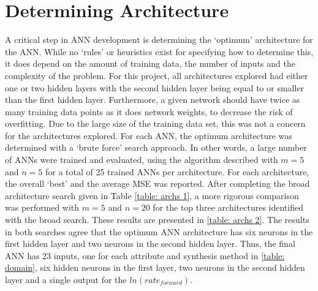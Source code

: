 \section{Determining Architecture}
A critical step in ANN development is determining the `optimum' architecture for the ANN. While no `rules' or heuristics exist for specifying how to determine this, it does depend on the amount of training data, the number of inputs and the complexity of the problem. For this project, all architectures explored had either one or two hidden layers with the second hidden layer being equal to or smaller than the first hidden layer. Furthermore, a given network should have twice as many training data points as it does network weights, to decrease the risk of overfitting. Due to the large size of the training data set, this was not a concern for the architectures explored. For each ANN, the optimum architecture was determined with a `brute force' search approach. In other words, a large number of ANNs were trained and evaluated, using the algorithm described with $m = 5$ and $n = 5$ for a total of 25 trained ANNs per architecture. For each architecture, the overall `best' and the average MSE was reported. After completing the broad architecture search given in Table \ref{table: archs 1}, a more rigorous comparison was performed with $m = 5$ and $n = 20$ for the top three architectures identified with the broad search. These results are presented in \ref{table: archs 2}. The results in both searches agree that the optimum ANN architecture has six neurons in the first hidden layer and two neurons in the second hidden layer. Thus, the final ANN has 23 inputs, one for each attribute and synthesis method in \ref{table: domain}, six hidden neurons in the first layer, two neurons in the second hidden layer and a single output for the $ln(rate_{forward})$. 
		
